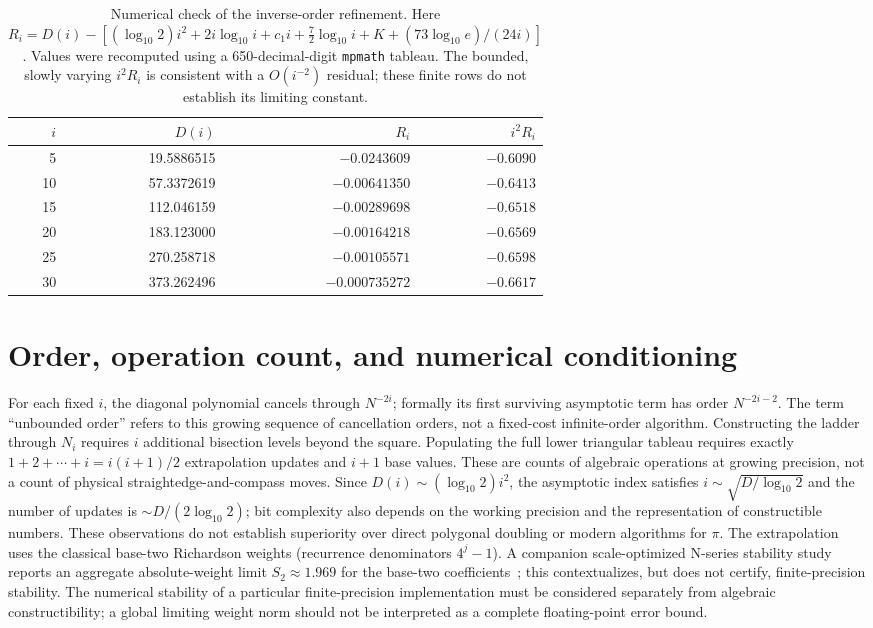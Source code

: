 \documentclass[11pt]{article}
\begin{document}
\begin{table}[ht]
\centering\small
\begin{tabular}{rrrr}
\toprule
$i$ & $D(i)$ & $R_i$ & $i^2R_i$\\
\midrule
5  & 19.5886515 & $-0.0243609$ & $-0.6090$\\
10 & 57.3372619 & $-0.00641350$ & $-0.6413$\\
15 & 112.046159 & $-0.00289698$ & $-0.6518$\\
20 & 183.123000 & $-0.00164218$ & $-0.6569$\\
25 & 270.258718 & $-0.00105571$ & $-0.6598$\\
30 & 373.262496 & $-0.000735272$ & $-0.6617$\\
\bottomrule
\end{tabular}
\caption{Numerical check of the inverse-order refinement. Here
$R_i=D(i)-[(\log_{10}2)i^2+2i\log_{10}i+c_1i+
\tfrac72\log_{10}i+K+(73\log_{10}e)/(24i)]$.
Values were recomputed using a 650-decimal-digit \texttt{mpmath} tableau.
The bounded, slowly varying $i^2R_i$ is consistent with a $O(i^{-2})$ residual;
these finite rows do not establish its limiting constant.}
\label{tab:digits-residual}
\end{table}

\section{Order, operation count, and numerical conditioning}
For each fixed $i$, the diagonal polynomial cancels through $N^{-2i}$; formally its first surviving asymptotic term has order $N^{-2i-2}$. The term ``unbounded order'' refers to this growing sequence of cancellation orders, not a fixed-cost infinite-order algorithm.
Constructing the ladder through $N_i$ requires $i$ additional bisection levels beyond the square. Populating the full lower triangular tableau requires exactly $1+2+\cdots+i=i(i+1)/2$ extrapolation updates and $i+1$ base values. These are counts of algebraic operations at growing precision, not a count of physical straightedge-and-compass moves. Since $D(i)\sim(\log_{10}2)i^2$, the asymptotic index satisfies $i\sim\sqrt{D/\log_{10}2}$ and the number of updates is $\sim D/(2\log_{10}2)$; bit complexity also depends on the working precision and the representation of constructible numbers. These observations do not establish superiority over direct polygonal doubling or modern algorithms for $\pi$.
The extrapolation uses the classical base-two Richardson weights (recurrence denominators $4^j-1$). A companion scale-optimized N-series stability study reports an aggregate absolute-weight limit $S_2\approx1.969$ for the base-two coefficients~\cite{bakerstability}; this contextualizes, but does not certify, finite-precision stability. The numerical stability of a particular finite-precision implementation must be considered separately from algebraic constructibility; a global limiting weight norm should not be interpreted as a complete floating-point error bound.
\end{document}

